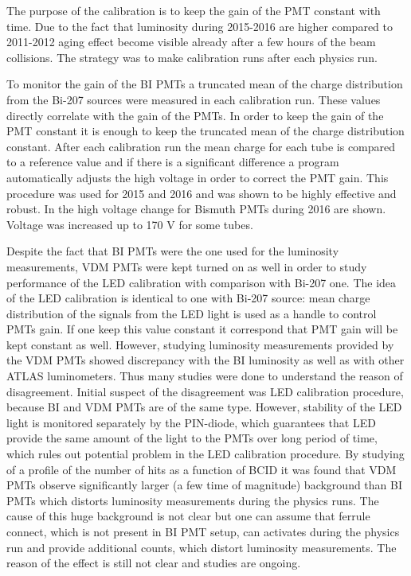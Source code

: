 
The purpose of the calibration is to keep the gain of the PMT constant with time.
Due to the fact that luminosity during 2015-2016 are higher compared to 2011-2012
aging effect become visible already after a few hours of the beam collisions.
The strategy was to make calibration runs after each physics run.

To monitor the gain of the BI PMTs a truncated mean of the charge distribution from the Bi-207 sources were measured in each calibration run.
These values directly correlate with the gain of the PMTs. 
In order to keep the gain of the PMT constant it is enough to keep the truncated mean of the charge distribution constant.
After each calibration run the mean charge for each tube is compared to a reference value and if there is a significant difference a program 
automatically adjusts the high voltage in order to correct the PMT gain.
This procedure was used for 2015 and 2016 and was shown to be highly effective and robust.
In  the high voltage change for Bismuth PMTs during 2016 are shown. 
Voltage was increased up to 170 V for some tubes.


Despite the fact that BI PMTs were the one used for the luminosity measurements, 
VDM PMTs were kept turned on as well in order to study performance of the LED calibration with comparison with Bi-207 one.
The idea of the LED calibration is identical to one with Bi-207 source: mean charge distribution of the signals from the LED light
is used as a handle to control PMTs gain. If one keep this value constant it correspond that PMT gain will be kept constant as well.
However, studying luminosity measurements provided by the VDM PMTs showed discrepancy with the BI luminosity as well as with other ATLAS
luminometers. Thus many studies were done to understand the reason of disagreement.
Initial suspect of the disagreement was LED calibration procedure, because BI and VDM PMTs are of the same type.
However, stability of the LED light is monitored separately by the PIN-diode, which guarantees that LED provide the same 
amount of the light to the PMTs over long period of time, which rules out potential problem in the LED calibration procedure.
By studying of a profile of the number of hits as a function of BCID it was found that VDM PMTs observe significantly larger (a few time of magnitude)
background than BI PMTs which distorts luminosity measurements during the physics runs. The cause of this huge background is not clear but one can
assume that ferrule connect, which is not present in BI PMT setup, can activates during the physics run and provide additional counts, which 
distort luminosity measurements. The reason of the effect is still not clear and studies are ongoing.

